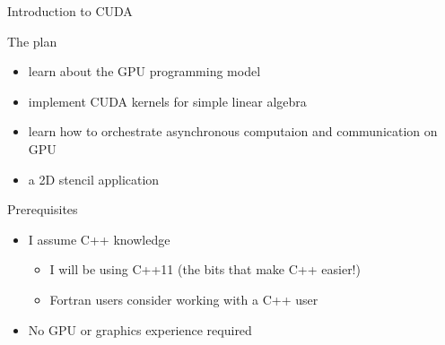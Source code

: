 
\begin{frame}[fragile]{Introduction to CUDA}
    \begin{info}{The plan}
        \begin{itemize}
            \item learn about the GPU programming model
            \item implement CUDA kernels for simple linear algebra
            \item learn how to orchestrate asynchronous computaion and communication on GPU
            \item a 2D stencil application
        \end{itemize}
    \end{info}

    \begin{info}{Prerequisites}
        \begin{itemize}
            \item I assume C++ knowledge
            \begin{itemize}
                \item I will be using C++11 (the bits that make C++ easier!)
                \item Fortran users consider working with a C++ user
            \end{itemize}
            \item No GPU or graphics experience required
        \end{itemize}
    \end{info}

\end{frame}

